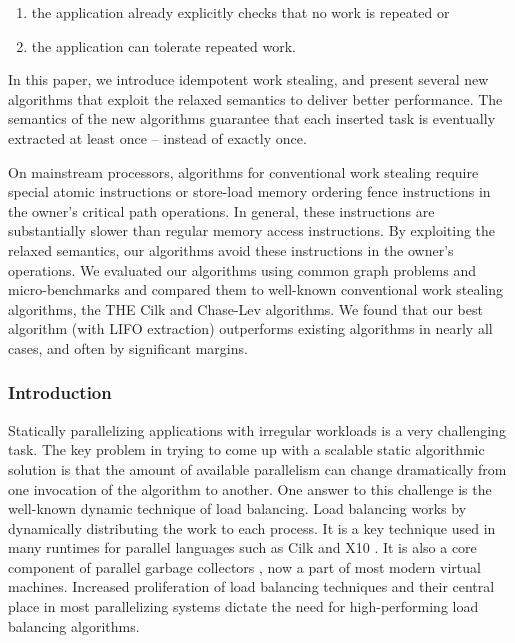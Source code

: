 \begin{enumerate}
\item the application already explicitly checks that no work is
  repeated or
\item the application can tolerate repeated work.
\end{enumerate}

In this paper, we introduce idempotent work stealing, and present
several new algorithms that exploit the relaxed semantics to deliver
better performance. The semantics of the new algorithms guarantee that
each inserted task is eventually extracted at least once -- instead of
exactly once.

On mainstream processors, algorithms for conventional work stealing
require special atomic instructions or store-load memory ordering
fence instructions in the owner's critical path operations. In
general, these instructions are substantially slower than regular
memory access instructions. By exploiting the relaxed semantics, our
algorithms avoid these instructions in the owner's operations. We
evaluated our algorithms using common graph problems and
micro-benchmarks and compared them to well-known conventional work
stealing algorithms, the THE Cilk and Chase-Lev algorithms. We found
that our best algorithm (with LIFO extraction) outperforms existing
algorithms in nearly all cases, and often by significant margins.

\subsubsection{Introduction}

Statically parallelizing applications with irregular workloads is a
very challenging task. The key problem in trying to come up with a
scalable static algorithmic solution is that the amount of available
parallelism can change dramatically from one invocation of the
algorithm to another. One answer to this challenge is the well-known
dynamic technique of load balancing. Load balancing works by
dynamically distributing the work to each process. It is a key
technique used in many runtimes for parallel languages such as Cilk
\cite{Blumofe1995, Frigo1998} and X10 \cite{Charles2005,
  Saraswat2010}. It is also a core component of parallel garbage
collectors \cite{Flood2001}, now a part of most modern virtual
machines. Increased proliferation of load balancing techniques and
their central place in most parallelizing systems dictate the need for
high-performing load balancing algorithms.

